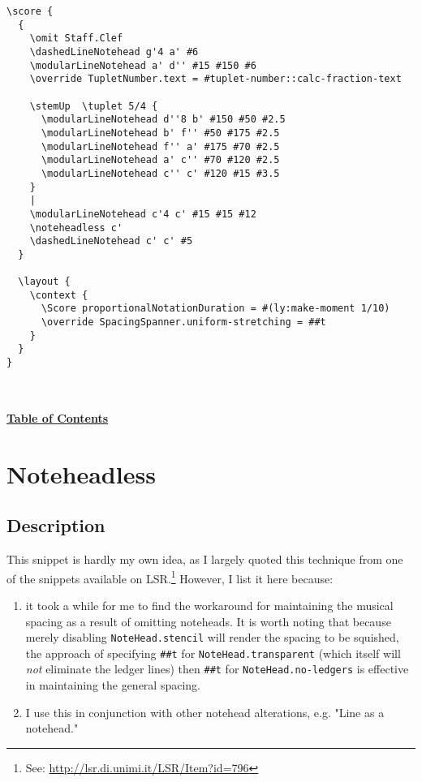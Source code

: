 \documentclass[11pt, oneside]{book}   	%
\begin{document}
\begin{verbatim}
\score {
  {
    \omit Staff.Clef
    \dashedLineNotehead g'4 a' #6
    \modularLineNotehead a' d'' #15 #150 #6
    \override TupletNumber.text = #tuplet-number::calc-fraction-text

    \stemUp  \tuplet 5/4 {
      \modularLineNotehead d''8 b' #150 #50 #2.5
      \modularLineNotehead b' f'' #50 #175 #2.5
      \modularLineNotehead f'' a' #175 #70 #2.5
      \modularLineNotehead a' c'' #70 #120 #2.5
      \modularLineNotehead c'' c' #120 #15 #3.5
    }
    |
    \modularLineNotehead c'4 c' #15 #15 #12
    \noteheadless c'
    \dashedLineNotehead c' c' #5
  }

  \layout {
    \context {
      \Score proportionalNotationDuration = #(ly:make-moment 1/10)    
      \override SpacingSpanner.uniform-stretching = ##t
    }
  }
}


\end{verbatim}
\hyperref[sec:toc]{\\ \textbf{Table of Contents}}

\vfill \break




\section {Noteheadless}
\hfill

\subsection{Description}
This snippet is hardly my own idea, as I largely quoted this technique from one of the snippets available on LSR.\footnote{See: \url{http://lsr.di.unimi.it/LSR/Item?id=796}} However, I list it here because: 
\begin{enumerate} 
\item it took a while for me to find the workaround for maintaining the musical spacing as a result of omitting noteheads. It is worth noting that because merely disabling \verb|NoteHead.stencil| will render the spacing to be squished, the approach of specifying \verb|##t| for \verb|NoteHead.transparent| (which itself will \textit{not} eliminate the ledger lines) then \verb|##t| for \verb|NoteHead.no-ledgers| is effective in maintaining the general spacing.
\item I use this in conjunction with other notehead alterations, e.g. "Line as a notehead." 
\end{enumerate}
\end{document}
